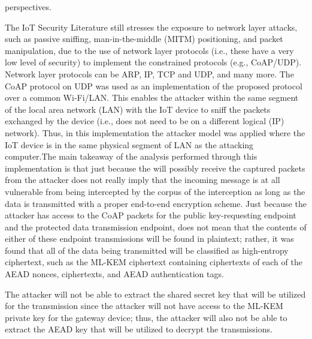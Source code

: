 \documentclass[a4paper]{scrartcl}
\begin{document}
perspectives.~\cite{Tao2024} ~\cite{asif2021} ~\cite{sel2019} ~\cite{fabio2023} ~\cite{tina2021}
    
    The IoT Security Literature still stresses the exposure to network layer attacks, such as passive sniffing, man-in-the-middle (MITM) positioning, and packet manipulation, due to the use of network layer protocols (i.e., these have a very low level of security) to implement the constrained protocols (e.g., CoAP/UDP). Network layer protocols can be ARP, IP, TCP and UDP, and many more. The CoAP protocol on UDP was used as an implementation of the proposed protocol over a common Wi-Fi/LAN. This enables the attacker within the same segment of the local area network (LAN) with the IoT device to sniff the packets exchanged by the device (i.e., does not need to be on a different logical (IP) network). Thus, in this implementation the attacker model was applied where the IoT device is in the same physical segment of LAN as the attacking computer.The main takeaway of the analysis performed through this implementation is that just because the will possibly receive the captured packets from the attacker does not really imply that the incoming message is at all vulnerable from being intercepted by the corpus of the interception as long as the data is transmitted with a proper end-to-end encryption scheme. Just because the attacker has access to the CoAP packets for the public key-requesting endpoint and the protected data transmission endpoint, does not mean that the contents of either of these endpoint transmissions will be found in plaintext; rather, it was found that all of the data being transmitted will be classified as high-entropy ciphertext, such as the ML-KEM ciphertext containing ciphertexts of each of the AEAD nonces, ciphertexts, and AEAD authentication tags.\cite{NISTFIPS203} \cite{shelby2014}
    
    The attacker will not be able to extract the shared secret key that will be utilized for the transmission since the attacker will not have access to the ML-KEM private key for the gateway device; thus, the attacker will also not be able to extract the AEAD key that will be utilized to decrypt the transmissions.\cite{NISTFIPS203}
    
\end{document}
